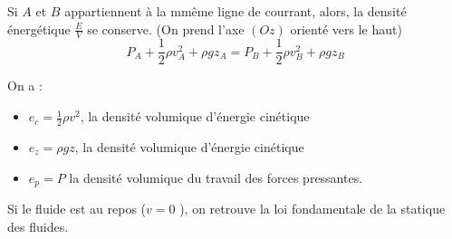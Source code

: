 \begin{theorem}\label{thm:relbern}
    Si \(A\) et \(B\) appartiennent à la mmême ligne de courrant, alors, la densité énergétique \(\frac{E}{V}\) se conserve. (On prend l'axe \((Oz)\) orienté vers le haut)
    \[
        P_{A} + \frac{1}{2} \rho v_{A}^{2} + \rho g z_{A} = P_{B} + \frac{1}{2} \rho  v_{B}^{2} + \rho g z_{B}
    \] 
\end{theorem}

\begin{definition}\label{def:efluide}
    On a :\\
    \begin{itemize}
        \item \(e_{c} = \frac{1}{2} \rho v^{2}\), la densité volumique d'énergie cinétique
        \item \(e_{z} = \rho g z\), la densité volumique d'énergie cinétique
        \item \(e_{p} = P\) la densité volumique du travail des forces pressantes. 
    \end{itemize}
\end{definition}

\begin{remark}
    Si le fluide est au repos (\(v = 0\) ), on retrouve la loi fondamentale de la statique des fluides.
\end{remark}